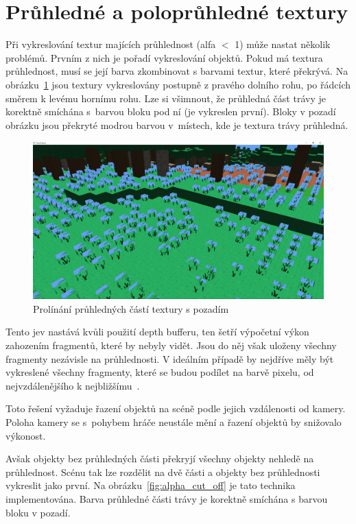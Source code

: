 \documentclass[thesis=M,czech]{FITthesis}[2019/12/23]
\begin{document}
\section{Průhledné a poloprůhledné textury}

Při vykreslování textur majících průhlednost (alfa $<$ 1) může nastat několik problémů. Prvním z nich je pořadí vykreslování objektů. Pokud má textura průhlednost, musí se její barva zkombinovat s barvami textur, které překrývá. Na obrázku~\ref{fig:alpha} jsou textury vykreslovány postupně z pravého dolního rohu, po řádcích směrem k levému hornímu rohu. Lze si všimnout, že průhledná část trávy je korektně smíchána s~barvou bloku pod ní (je vykreslen první). Bloky v pozadí obrázku jsou překryté modrou barvou v~místech, kde je textura trávy průhledná.

\begin{figure}\centering
	\includegraphics[width=\textwidth]{images/alpha}
	\caption[Prolínání průhledných částí textury s pozadím]{Prolínání průhledných částí textury s pozadím}\label{fig:alpha}
\end{figure}

Tento jev nastává kvůli použití depth bufferu, ten šetří výpočetní výkon zahozením fragmentů, které by nebyly vidět. Jsou do něj však uloženy všechny fragmenty nezávisle na průhlednosti. V ideálním případě by nejdříve měly být vykreslené všechny fragmenty, které se budou podílet na barvě pixelu, od nejvzdálenějšího k nejbližšímu~\cite{lopgl_blend}.

Toto řešení vyžaduje řazení objektů na scéně podle jejich vzdálenosti od kamery. Poloha kamery se s~pohybem hráče neustále mění a řazení objektů by snižovalo výkonost.

Avšak objekty bez průhledných části překryjí všechny objekty nehledě na průhlednost. Scénu tak lze rozdělit na dvě části a objekty bez průhlednosti vykreslit jako první. Na obrázku~\ref{fig:alpha_cut_off} je tato technika implementována. Barva průhledné části trávy je korektně smíchána s barvou bloku v pozadí.
\end{document}
